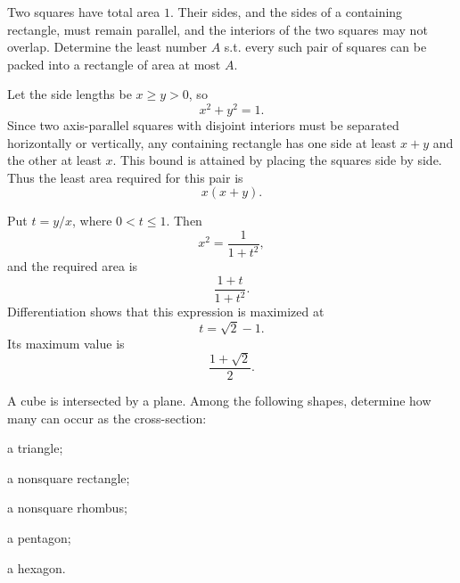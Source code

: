     \begin{expectedproblem}[1996 Putnam]
        Two squares have total area $1$. Their sides, and the sides of a
        containing rectangle, must remain parallel, and the interiors of the
        two squares may not overlap. Determine the least number $A$ s.t.
        every such pair of squares can be packed into a rectangle of area at
        most $A$.
    \end{expectedproblem}

    \begin{solution}
        Let the side lengths be $x\geq y>0$, so
        \[
            x^2+y^2=1.
        \]
        Since two axis-parallel squares with disjoint interiors must be
        separated horizontally or vertically, any containing rectangle has one
        side at least $x+y$ and the other at least $x$. This bound is attained
        by placing the squares side by side. Thus the least area required for
        this pair is
        \[
            x(x+y).
        \]

        Put $t=y/x$, where $0<t\leq1$. Then
        \[
            x^2=\frac{1}{1+t^2},
        \]
        and the required area is
        \[
            \frac{1+t}{1+t^2}.
        \]
        Differentiation shows that this expression is maximized at
        \[
            t=\sqrt2-1.
        \]
        Its maximum value is
        \[
            \boxed{\frac{1+\sqrt2}{2}}.
        \]
    \end{solution}

    \begin{expectedproblem}[1994 CSAT]
        A cube is intersected by a plane. Among the following shapes, determine
        how many can occur as the cross-section:
        \begin{problemchoices}
            \item a triangle;
            \item a nonsquare rectangle;
            \item a nonsquare rhombus;
            \item a pentagon;
            \item a hexagon.
        \end{problemchoices}
    \end{expectedproblem}

